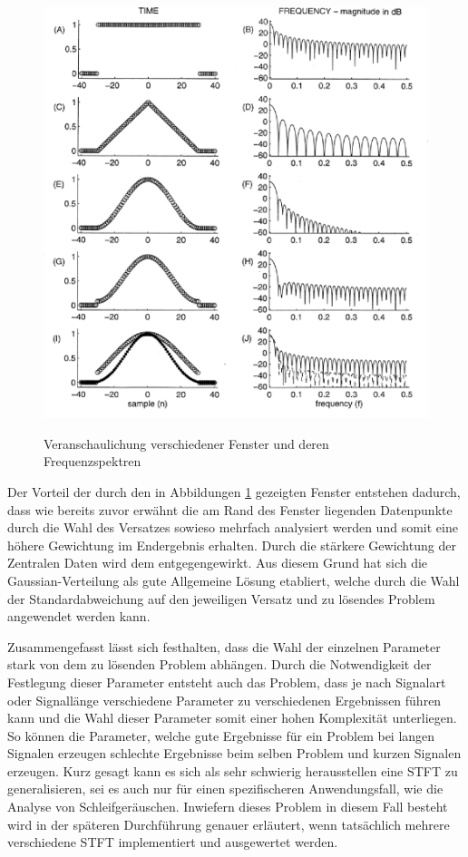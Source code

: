     \begin{figure}[H]
        \centering
        \includegraphics[width=0.5\linewidth]{images/Veranschaulichung verschiedener Fenster und deren Frequenzspektren.png}
        \caption{Veranschaulichung verschiedener Fenster und deren Frequenzspektren} \cite{windowFunctions}
        \label{fig:Veranschaulichung verschiedener Fenster und deren Frequenzspektren}
    \end{figure}
    
Der Vorteil der durch den in Abbildungen \ref{fig:Veranschaulichung verschiedener Fenster und deren Frequenzspektren} gezeigten Fenster entstehen dadurch, dass wie bereits zuvor erwähnt die am Rand des Fenster liegenden Datenpunkte durch die Wahl des Versatzes sowieso mehrfach analysiert werden und somit eine höhere Gewichtung im Endergebnis erhalten. Durch die stärkere Gewichtung der Zentralen Daten wird dem entgegengewirkt. Aus diesem Grund hat sich die Gaussian-Verteilung als gute Allgemeine Lösung etabliert, welche durch die Wahl der Standardabweichung auf den jeweiligen Versatz und zu lösendes Problem angewendet werden kann.
    
Zusammengefasst lässt sich festhalten, dass die Wahl der einzelnen Parameter stark von dem zu lösenden Problem abhängen. Durch die Notwendigkeit der Festlegung dieser Parameter entsteht auch das Problem, dass je nach Signalart oder Signallänge verschiedene Parameter zu verschiedenen Ergebnissen führen kann und die Wahl dieser Parameter somit einer hohen Komplexität unterliegen. So können die Parameter, welche gute Ergebnisse für ein Problem bei langen Signalen erzeugen schlechte Ergebnisse beim selben Problem und kurzen Signalen erzeugen. Kurz gesagt kann es sich als sehr schwierig herausstellen eine \ac{STFT} zu generalisieren, sei es auch nur für einen spezifischeren Anwendungsfall, wie die Analyse von Schleifgeräuschen. Inwiefern dieses Problem in diesem Fall besteht wird in der späteren Durchführung genauer erläutert, wenn tatsächlich mehrere verschiedene \ac{STFT} implementiert und ausgewertet werden.

